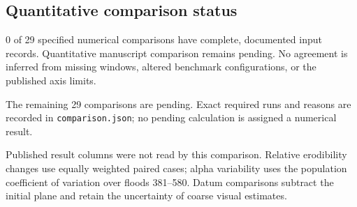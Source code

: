 \subsection{Quantitative comparison status}
0 of 29 specified numerical comparisons have complete, documented input records. Quantitative manuscript comparison remains pending. No agreement is inferred from missing windows, altered benchmark configurations, or the published axis limits.

The remaining 29 comparisons are pending. Exact required runs and reasons are recorded in \texttt{comparison.json}; no pending calculation is assigned a numerical result.

Published result columns were not read by this comparison. Relative erodibility changes use equally weighted paired cases; alpha variability uses the population coefficient of variation over floods 381--580. Datum comparisons subtract the initial plane and retain the uncertainty of coarse visual estimates.
